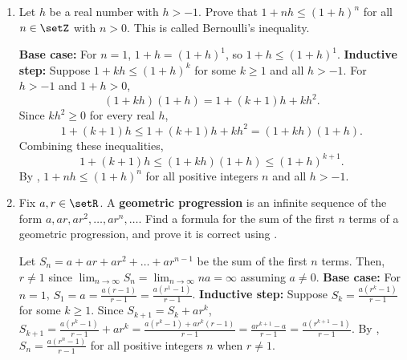 \begin{enumerate}
\begin{enumerate}
\begin{subprove}
      Therefore, all amounts of postage \(n \geq 20\) can be formed using just \(5\)-cent and \(6\)-cent stamps.
    \end{subprove}
  \end{enumerate}
  \newpage
  \item Let \(h\) be a real number with \(h > -1\).
  Prove that \(1 + n h \leq (1 + h)^{n}\) for all \(n \in \setZ\) with \(n > 0\).
  This is called Bernoulli's inequality.
  \begin{subprove}
    \textbf{Base case:} For \(n = 1\), \(1 + h = (1 + h)^{1}\), 
    so \(1 + h \leq (1 + h)^{1}\).\proofstep
    \textbf{Inductive step:} Suppose \(1 + k h \leq (1 + h)^{k}\) 
    for some \(k \geq 1\) and all \(h > -1\).
    For \(h > -1\) and \(1 + h > 0\), 
    \[
      (1 + k h)(1 + h) = 1 + (k+1)h + k h^{2}.
    \]
    Since \(k h^{2}\ge 0\) for every real \(h\), 
    \[
      1 + (k+1)h \le 1 + (k+1)h + k h^{2} = (1 + k h)(1 + h).
    \]
    Combining these inequalities,
    \[
      1 + (k+1)h \le (1 + k h)(1 + h) \le (1 + h)^{k+1}.
    \]
    By , \(1 + n h \leq (1 + h)^{n}\) for all positive integers \(n\) and all \(h > -1\).
  \end{subprove}
  \item Fix \(a, r \in \setR\).
  A \textbf{geometric progression} is an infinite sequence of the form \(a, a r, a r^{2}, \ldots, a r^{n}, \ldots\).
  Find a formula for the sum of the first \(n\) terms of a geometric progression, and prove it is correct using .
  \begin{subprove}
    Let \(S_{n} = a + a r + a r^{2} + \ldots + a r^{n-1}\) 
    be the sum of the first \(n\) terms. Then, \(r \neq 1\) since
    \(\lim_{n \to \infty} S_{n} = \lim_{n \to \infty} n a = \infty\) assuming \(a \neq 0\).\proofstep
    \textbf{Base case:} For \(n = 1\), 
    \(S_{1} = a = \frac{a(r - 1)}{r - 1} = \frac{a(r^{1} - 1)}{r - 1}\).\proofstep
    \textbf{Inductive step:} Suppose \(S_{k} = \frac{a(r^{k} - 1)}{r - 1}\) for some \(k \geq 1\).
    Since \(S_{k+1} = S_{k} + a r^{k}\), 
    \(S_{k+1} = \frac{a(r^{k} - 1)}{r - 1} + a r^{k} = \frac{a(r^{k} - 1) + a r^{k}(r - 1)}{r - 1} = \frac{a r^{k+1} - a}{r - 1} = \frac{a(r^{k+1} - 1)}{r - 1}\).\proofstep
    By , \(S_{n} = \frac{a(r^{n} - 1)}{r - 1}\) for all positive integers \(n\) when \(r \neq 1\).
  \end{subprove}
\end{enumerate}






